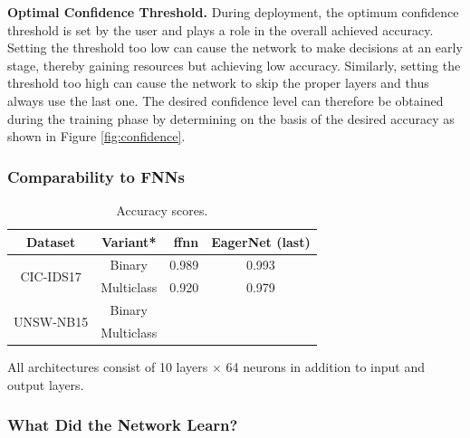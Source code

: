 \documentclass[conference]{IEEEtran}
\begin{document}
\textbf{Optimal Confidence Threshold.}
During deployment, the optimum confidence threshold is set by the user and plays a role in the overall achieved accuracy. Setting the threshold too low can cause the network to make decisions at an early stage, thereby gaining resources but achieving low accuracy. Similarly, setting the threshold too high can cause the network to skip the proper layers and thus always use the last one. The desired confidence level can therefore be obtained during the training phase by determining on the basis of the desired accuracy as shown in Figure \ref{fig:confidence}.

\subsubsection{Comparability to FNNs}
\label{comparability_to_fnns}


\begin{table}

\centering
\begin{tabular}{ccrc}
\toprule
\textbf{Dataset} & \textbf{Variant*} & \textbf{\gls{ffnn}} & \textbf{EagerNet (last)} \\
\midrule
\multirow{2}{*}{CIC-IDS17} & Binary & 0.989 & 0.993 \\
 & Multiclass & 0.920 & 0.979 \\
\midrule
\multirow{2}{*}{UNSW-NB15} & Binary & & \\
 & Multiclass & & \\
\midrule

\end{tabular}
\vspace{1ex}

{\raggedright * All architectures consist of 10 layers $\times$ 64 neurons in addition to input and output layers. \par}
\caption{Accuracy scores.}


\end{table}

\subsubsection{What Did the Network Learn?}
\end{document}
